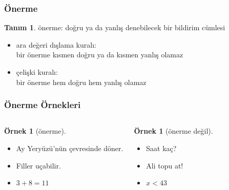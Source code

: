 \documentclass[dvipsnames]{beamer}
\theoremstyle{definition}
\newtheorem{tanim}[theorem]{Tanım}
\theoremstyle{example}
\newtheorem{ornek}[theorem]{Örnek}
\theoremstyle{plain}
\begin{document}
\begin{frame}
  \frametitle{Önerme}

  \begin{tanim}
    \alert{önerme}: doğru ya da yanlış denebilecek bir bildirim cümlesi
  \end{tanim}

  \pause
  \begin{itemize}
    \item \alert{ara değeri dışlama kuralı}:\\
      bir önerme kısmen doğru ya da kısmen yanlış olamaz
  \end{itemize}

  \pause
  \begin{itemize}
    \item \alert{çelişki kuralı}:\\
      bir önerme hem doğru hem yanlış olamaz
  \end{itemize}
\end{frame}

\begin{frame}
  \frametitle{Önerme Örnekleri}

  \begin{columns}[t]
    \begin{ornek}[önerme]
      \begin{itemize}
        \item Ay Yeryüzü'nün çevresinde döner.
        \item Filler uçabilir.
        \item $3+8=11$
      \end{itemize}
    \end{ornek}

    \pause
    \begin{ornek}[önerme değil]
      \begin{itemize}
        \item Saat kaç?
        \item Ali topu at!
        \item $x<43$
      \end{itemize}
    \end{ornek}
  \end{columns}
\end{frame}
\end{document}
